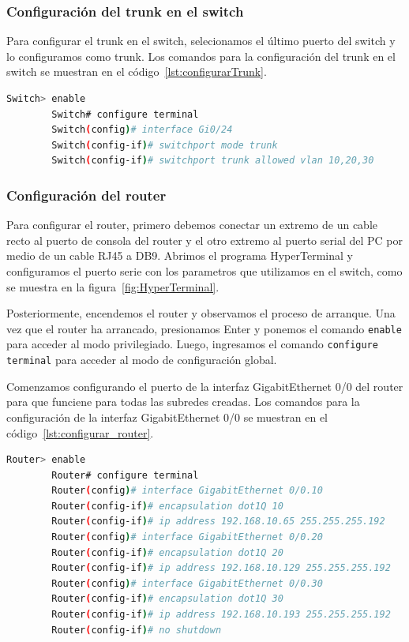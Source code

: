     \subsubsection*{Configuración del trunk en el switch}

    Para configurar el trunk en el switch, selecionamos el último puerto del switch y lo configuramos como trunk. Los comandos para la configuración del trunk en el switch se muestran en el código~\ref{lst:configurarTrunk}.

    \begin{lstlisting}[language=bash, caption={Configuración del trunk en el switch}, label={lst:configurarTrunk}]
        Switch> enable
        Switch# configure terminal
        Switch(config)# interface Gi0/24
        Switch(config-if)# switchport mode trunk
        Switch(config-if)# switchport trunk allowed vlan 10,20,30
    \end{lstlisting}

    \subsubsection*{Configuración del router}

    Para configurar el router, primero debemos conectar un extremo de un cable recto al puerto de consola del router y el otro extremo al puerto serial del PC por medio de un cable RJ45 a DB9. Abrimos el programa HyperTerminal y configuramos el puerto serie con los parametros que utilizamos en el switch, como se muestra en la figura~\ref{fig:HyperTerminal}.

    Posteriormente, encendemos el router y observamos el proceso de arranque. Una vez que el router ha arrancado, presionamos Enter y ponemos el comando \texttt{enable} para acceder al modo privilegiado. Luego, ingresamos el comando \texttt{configure terminal} para acceder al modo de configuración global.

    Comenzamos configurando el puerto de la interfaz GigabitEthernet 0/0 del router para que funciene para todas las subredes creadas. Los comandos para la configuración de la interfaz GigabitEthernet 0/0 se muestran en el código~\ref{lst:configurar_router}.

    \begin{lstlisting}[language=bash, caption={Configuración de las interfaces del router}, label={lst:configurar_router}]
        Router> enable
        Router# configure terminal
        Router(config)# interface GigabitEthernet 0/0.10
        Router(config-if)# encapsulation dot1Q 10
        Router(config-if)# ip address 192.168.10.65 255.255.255.192
        Router(config)# interface GigabitEthernet 0/0.20
        Router(config-if)# encapsulation dot1Q 20
        Router(config-if)# ip address 192.168.10.129 255.255.255.192
        Router(config)# interface GigabitEthernet 0/0.30
        Router(config-if)# encapsulation dot1Q 30
        Router(config-if)# ip address 192.168.10.193 255.255.255.192
        Router(config-if)# no shutdown
    \end{lstlisting}

